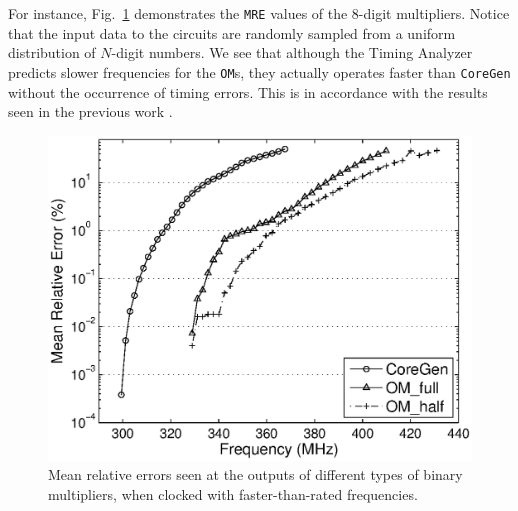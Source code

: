 \documentclass[conference]{IEEEtran}
\begin{document}
For instance, Fig.~\ref{Fig:PM_MRE} demonstrates the \texttt{MRE} values of the 8-digit multipliers. Notice that the input data to the circuits are randomly sampled from a uniform distribution of $N$-digit numbers. We see that although the Timing Analyzer predicts slower frequencies for the \texttt{OM}s, they actually operates faster than \texttt{CoreGen} without the occurrence of timing errors. This is in accordance with the results seen in the previous work \cite{SKDAC14}.

\begin{figure}[tbp]
  \centering
  \includegraphics[width=.48\textwidth]{./Figures/Exp/MRE_PM.eps}
  \caption{Mean relative errors seen at the outputs of different types of binary multipliers, when clocked with faster-than-rated frequencies.}
  \label{Fig:PM_MRE}
  \vspace{-1ex}
\end{figure}




%
\end{document}
